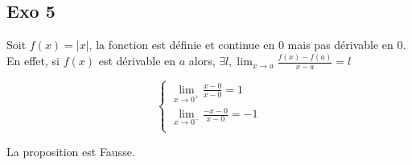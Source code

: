 \documentclass[]{book}
\theoremstyle{definition}
\begin{document}
\subsection*{Exo 5}
Soit $f(x) = |x|$, la fonction est d\'efinie et continue en $0$ mais pas d\'erivable en $0$.
En effet, si $f(x)$ est d\'erivable en $a$ alors, $\exists l, \lim_{x \to a}\frac{f(x)-f(a)}{x-a} = l$

$$ 
\left\{ 
\begin{array}{l}
 \lim_{x \to 0^{+}} \frac{x - 0}{x-0} = 1 \\
 \lim_{x \to 0^{-}} \frac{-x - 0}{x-0} = -1 \\
\end{array}
\right. 
$$

La proposition est Fausse.
\end{document}
